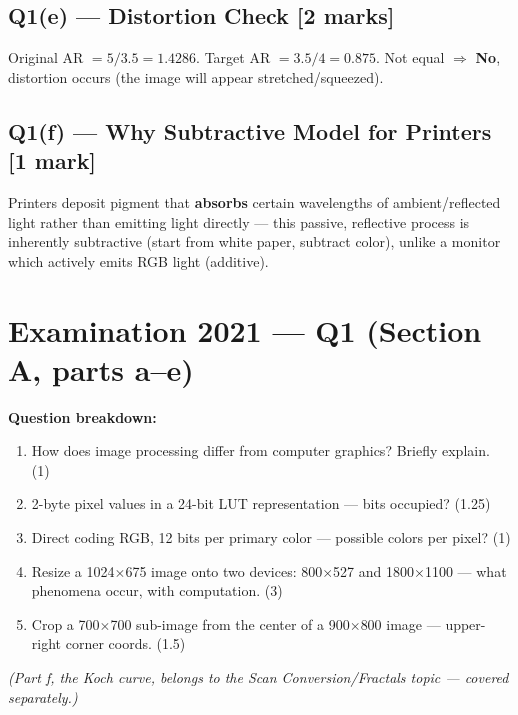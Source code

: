 \documentclass[12pt, a4paper]{article}
\newenvironment{solutionbox}{\begin{mdframed}[style=solutionframe]}{\end{mdframed}}
\newenvironment{answerbox}{\begin{mdframed}[style=answerframe]}{\end{mdframed}}
\begin{document}
\subsection*{Q1(e) --- Distortion Check [2 marks]}
\begin{answerbox}
Original AR $= 5/3.5 = 1.4286$. Target AR $= 3.5/4 = 0.875$. Not equal $\Rightarrow$ \textbf{No}, distortion occurs (the image will appear stretched/squeezed).
\end{answerbox}

\subsection*{Q1(f) --- Why Subtractive Model for Printers [1 mark]}
Printers deposit pigment that \textbf{absorbs} certain wavelengths of ambient/reflected light rather than emitting light directly — this passive, reflective process is inherently subtractive (start from white paper, subtract color), unlike a monitor which actively emits RGB light (additive).

\section{Examination 2021 --- Q1 (Section A, parts a--e)}

\begin{solutionbox}
\textbf{Question breakdown:}
\begin{enumerate}[noitemsep]
  \item[(a)] How does image processing differ from computer graphics? Briefly explain. (1)
  \item[(b)] 2-byte pixel values in a 24-bit LUT representation --- bits occupied? (1.25)
  \item[(c)] Direct coding RGB, 12 bits per primary color --- possible colors per pixel? (1)
  \item[(d)] Resize a 1024$\times$675 image onto two devices: 800$\times$527 and 1800$\times$1100 --- what phenomena occur, with computation. (3)
  \item[(e)] Crop a 700$\times$700 sub-image from the center of a 900$\times$800 image --- upper-right corner coords. (1.5)
\end{enumerate}
\emph{(Part f, the Koch curve, belongs to the Scan Conversion/Fractals topic --- covered separately.)}
\end{solutionbox}
\end{document}
